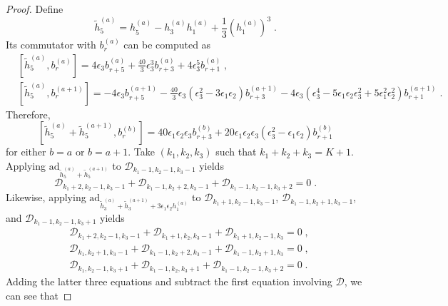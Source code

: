 \documentclass[11pt]{article}
\numberwithin{equation}{section}
\numberwithin{figure}{section}
\numberwithin{table}{section}
\begin{document}
\begin{proof}
	Define
	\begin{equation}
		\widetilde{h}^{(a)}_5=h^{(a)}_5-h^{(a)}_3h^{(a)}_1+\frac{1}{3}\left(h^{(a)}_1\right)^3\;.
	\end{equation}
	Its commutator with $b^{(a)}_r$ can be computed as
	\begin{subequations}
		\begin{align}
			&\left[\widetilde{h}^{(a)}_5,b^{(a)}_r\right]=4\epsilon_3b^{(a)}_{r+5}+\frac{40}{3}\epsilon_3^3b^{(a)}_{r+3}+4\epsilon_3^5b^{(a)}_{r+1}\;,\\
			&\left[\widetilde{h}^{(a)}_5,b^{(a+1)}_r\right]=-4\epsilon_3b^{(a+1)}_{r+5}-\frac{40}{3}\epsilon_3\left(\epsilon_3^2-3\epsilon_1\epsilon_2\right)b^{(a+1)}_{r+3}-4\epsilon_3\left(\epsilon_3^4-5\epsilon_1\epsilon_2\epsilon_3^2+5\epsilon_1^2\epsilon_2^2\right)b^{(a+1)}_{r+1}\;.
		\end{align}
	\end{subequations}
	Therefore,
	\begin{equation}
		\left[\widetilde{h}^{(a)}_5+\widetilde{h}^{(a+1)}_5,b^{(b)}_r\right]=40\epsilon_1\epsilon_2\epsilon_3b^{(b)}_{r+3}+20\epsilon_1\epsilon_2\epsilon_3\left(\epsilon_3^2-\epsilon_1\epsilon_2\right)b^{(b)}_{r+1}
	\end{equation}
	for either $b=a$ or $b=a+1$. Take $(k_1,k_2,k_3)$ such that $k_1+k_2+k_3=K+1$. Applying $\mathrm{ad}_{\widetilde{h}^{(a)}_5+\widetilde{h}^{(a+1)}_5}$ to $\mathcal{D}_{k_1-1,k_2-1,k_3-1}$ yields
	\begin{equation}
		\mathcal{D}_{k_1+2,k_2-1,k_3-1}+\mathcal{D}_{k_1-1,k_2+2,k_3-1}+\mathcal{D}_{k_1-1,k_2-1,k_3+2}=0\;.
	\end{equation}
	Likewise, applying $\mathrm{ad}_{\widetilde{h}^{(a)}_3+\widetilde{h}^{(a+1)}_3+3\epsilon_1\epsilon_2h^{(a)}_1}$ to $\mathcal{D}_{k_1+1,k_2-1,k_3-1}$, $\mathcal{D}_{k_1-1,k_2+1,k_3-1}$, and $\mathcal{D}_{k_1-1,k_2-1,k_3+1}$ yields
	\begin{subequations}
		\begin{align}
			&\mathcal{D}_{k_1+2,k_2-1,k_3-1}+\mathcal{D}_{k_1+1,k_2,k_3-1}+\mathcal{D}_{k_1+1,k_2-1,k_3}=0\;,\\
			&\mathcal{D}_{k_1,k_2+1,k_3-1}+\mathcal{D}_{k_1-1,k_2+2,k_3-1}+\mathcal{D}_{k_1-1,k_2+1,k_3}=0\;,\\
			&\mathcal{D}_{k_1,k_2-1,k_3+1}+\mathcal{D}_{k_1-1,k_2,k_3+1}+\mathcal{D}_{k_1-1,k_2-1,k_3+2}=0\;.
		\end{align}
	\end{subequations}
	Adding the latter three equations and subtract the first equation involving $\mathcal{D}$, we can see that

\end{proof}
\end{document}
